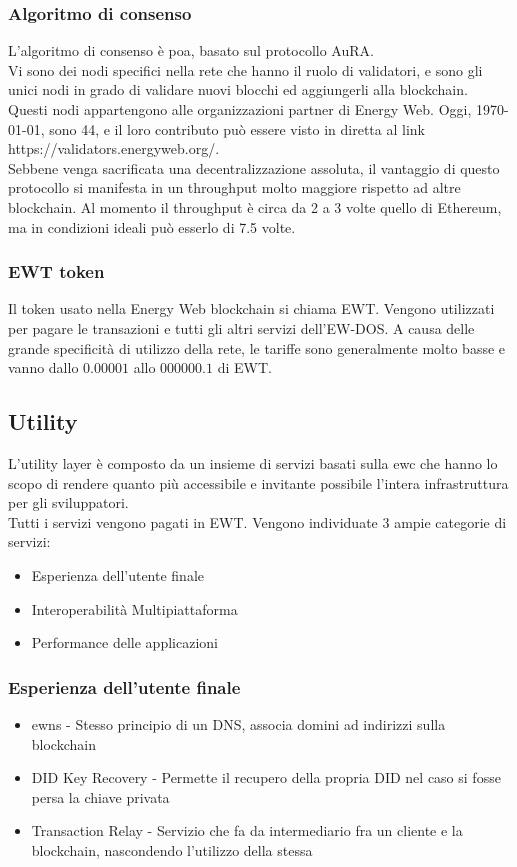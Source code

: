 \documentclass[12pt, letterpaper, twoside]{article}
\begin{document}
\subsubsection{Algoritmo di consenso}
L'algoritmo di consenso è \gls{poa}, basato sul protocollo AuRA\cite{art:aura}. \\
Vi sono dei nodi specifici nella rete che hanno il ruolo di validatori, e sono gli unici nodi in grado di validare nuovi blocchi ed aggiungerli alla blockchain.
Questi nodi appartengono alle organizzazioni partner di Energy Web. Oggi, \today, sono 44, e il loro contributo può essere visto in diretta al link https://validators.energyweb.org/.\\
Sebbene venga sacrificata una decentralizzazione assoluta, il vantaggio di questo protocollo si manifesta in un throughput molto maggiore rispetto ad altre blockchain.
Al momento il throughput è circa da 2 a 3 volte quello di Ethereum, ma in condizioni ideali può esserlo di 7.5 volte\cite{art:ew-dos}.

\subsubsection{EWT token}
Il token usato nella Energy Web blockchain si chiama EWT.
Vengono utilizzati per pagare le transazioni e tutti gli altri servizi dell'EW-DOS.
A causa delle grande specificità di utilizzo della rete, le tariffe sono generalmente molto basse e vanno dallo $0.00001$ allo $000000.1$ di EWT.

\subsection{Utility}
L'utility layer è composto da un insieme di servizi basati sulla \gls{ewc} che hanno lo scopo di rendere quanto più accessibile e invitante possibile l'intera infrastruttura per gli sviluppatori.\\
Tutti i servizi vengono pagati in EWT.
Vengono individuate 3 ampie categorie di servizi:
\begin{itemize}
    \item Esperienza dell'utente finale
    \item Interoperabilità Multipiattaforma
    \item Performance delle applicazioni
\end{itemize}

\subsubsection{Esperienza dell'utente finale}
\begin{itemize}
    \item \gls{ewns} - Stesso principio di un DNS, associa domini ad indirizzi sulla blockchain
    \item DID Key Recovery - Permette il recupero della propria DID nel caso si fosse persa la chiave privata
    \item Transaction Relay - Servizio che fa da intermediario fra un cliente e la blockchain, nascondendo l'utilizzo della stessa
\end{itemize}
\end{document}
